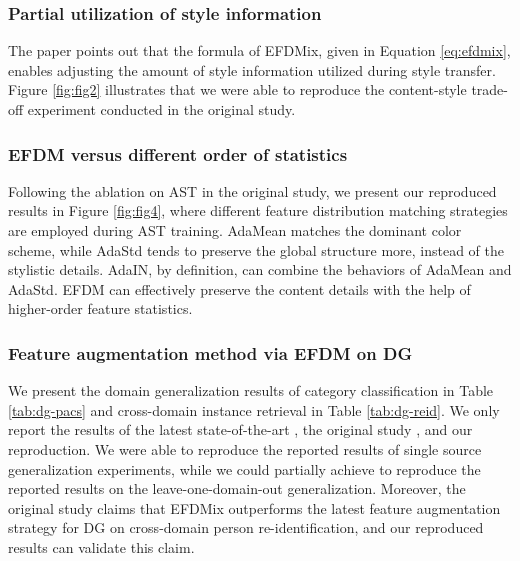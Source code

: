 \subsubsection{Partial utilization of style information}
The paper points out that the formula of EFDMix, given in Equation \ref{eq:efdmix}, enables adjusting the amount of style information utilized during style transfer. Figure \ref{fig:fig2} illustrates that we were able to reproduce the content-style trade-off experiment conducted in the original study.

\subsubsection{EFDM versus different order of statistics}
Following the ablation on AST in the original study, we present our reproduced results in Figure \ref{fig:fig4}, where different feature distribution matching strategies are employed during AST training. AdaMean matches the dominant color scheme, while AdaStd tends to preserve the global structure more, instead of the stylistic details. AdaIN, by definition, can combine the behaviors of AdaMean and AdaStd. EFDM can effectively preserve the content details with the help of higher-order feature statistics.

\subsubsection{Feature augmentation method via EFDM on DG}
We present the domain generalization results of category classification in Table \ref{tab:dg-pacs} and cross-domain instance retrieval in Table \ref{tab:dg-reid}. We only report the results of the latest state-of-the-art \cite{zhou2020domain}, the original study \cite{zhang2021exact}, and our reproduction. We were able to reproduce the reported results of single source generalization experiments, while we could partially achieve to reproduce the reported results on the leave-one-domain-out generalization. Moreover, the original study claims that EFDMix outperforms the latest feature augmentation strategy for DG on cross-domain person re-identification, and our reproduced results can validate this claim.

